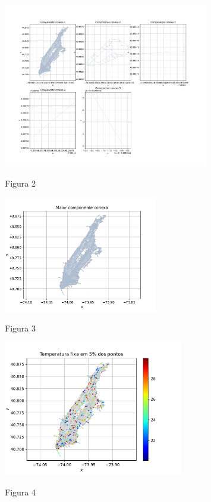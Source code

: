 \documentclass{article}
\begin{document}
    \begin{figure}[ht]
        \centering
        \includegraphics[width=0.8\textwidth, trim={0 2.3cm 0 3.1cm},clip]{../figs/fig2.pdf}
        
        Figura 2
    \end{figure}

    \vspace{3cm}

    \begin{figure}[ht]
        \centering
        \includegraphics[width=0.6\textwidth, trim={0 10px 0 25px},clip]{../figs/fig3.pdf}
        
        Figura 3
    \end{figure}

    \newpage

    \begin{figure}[ht]
        \centering
        \includegraphics[width=0.7\textwidth, trim={0 10px 0 25px},clip]{../figs/fig4.pdf}
        
        Figura 4
    \end{figure}
\end{document}

